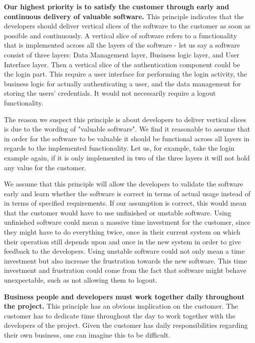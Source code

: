 \textbf{Our highest priority is to satisfy the customer through early and continuous delivery of valuable software.}
This principle indicates that the developers should deliver vertical slices of the software to the customer as soon as possible and continuously.
A vertical slice of software refers to a functionality that is implemented across all the layers of the software - let us say a software consist of three layers: Data Management layer, Business logic layer, and User Interface layer. 
Then a vertical slice of the authentication component could be the login part. 
This require a user interface for performing the login activity, the business logic for actually authenticating a user, and the data management for storing the users' credentials. 
It would not necessarily require a logout functionality.

The reason we suspect this principle is about developers to deliver vertical slices is due to the wording of "valuable software". 
We find it reasonable to assume that in order for the software to be valuable it should be functional across all layers in regards to the implemented functionality. 
Let us, for example, take the login example again, if it is only implemented in two of the three layers it will not hold any value for the customer.

We assume that this principle will allow the developers to validate the software early and learn whether the software is correct in terms of actual usage instead of in terms of specified requirements.
If our assumption is correct, this would mean that the customer would have to use unfinished or unstable software.
Using unfinished software could mean a massive time investment for the customer, since they might have to do everything twice, once in their current system on which their operation still depends upon and once in the new system in order to give feedback to the developers.
Using unstable software could not only mean a time investment but also increase the frustration towards the new software.
This time investment and frustration could come from the fact that software might behave unexpectable, such as not allowing them to logout.

\textbf{Business people and developers must work together daily throughout the project.}
This principle has an obvious implication on the customer.
The customer has to dedicate time throughout the day to work together with the developers of the project.
Given the customer has daily responsibilities regarding their own business, one can imagine this to be difficult.

